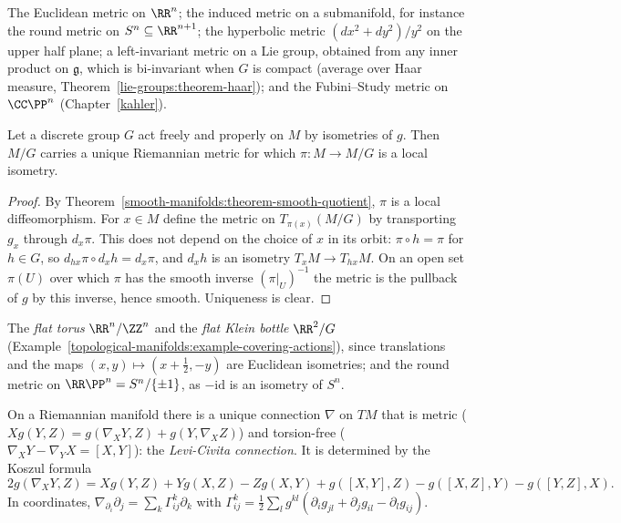 \begin{example}\label{riemannian-geometry:example-metrics}
The Euclidean metric on $\RR^n$; the induced metric on a submanifold, for instance the round metric on $S^n \subseteq \RR^{n+1}$; the hyperbolic metric $(dx^2 + dy^2)/y^2$ on the upper half plane; a
left-invariant metric on a Lie group, obtained from any inner product on $\mathfrak{g}$, which is bi-invariant when $G$ is compact (average over Haar measure,
Theorem~\ref{lie-groups:theorem-haar}); and the Fubini--Study metric on $\CC\PP^n$ (Chapter~\ref{kahler}).
\end{example}

\begin{proposition}\label{riemannian-geometry:proposition-quotient-metric}
Let a discrete group $G$ act freely and properly on $M$ by isometries of $g$. Then $M/G$ carries a unique Riemannian metric for which $\pi \colon M \to M/G$ is a local isometry.
\end{proposition}

\begin{proof}
By Theorem~\ref{smooth-manifolds:theorem-smooth-quotient}, $\pi$ is a local diffeomorphism. For $x \in M$ define the metric on $T_{\pi(x)}(M/G)$ by transporting $g_x$ through $d_x\pi$. This does not depend on the choice of $x$
in its orbit: $\pi \circ h = \pi$ for $h \in G$, so $d_{hx}\pi \circ d_xh = d_x\pi$, and $d_xh$ is an isometry $T_xM \to T_{hx}M$. On an open set $\pi(U)$ over which $\pi$ has the smooth inverse $(\pi|_U)^{-1}$ the metric is the pullback
of $g$ by this inverse, hence smooth. Uniqueness is clear.
\end{proof}

\begin{example}\label{riemannian-geometry:example-quotient-metrics}
The \emph{flat torus} $\RR^n/\ZZ^n$ and the \emph{flat Klein bottle} $\RR^2/G$ (Example~\ref{topological-manifolds:example-covering-actions}), since translations and the maps $(x, y) \mapsto (x + \frac12, -y)$ are Euclidean isometries; and
the round metric on $\RR\PP^n = S^n/\{\pm1\}$, as $-\mathrm{id}$ is an isometry of $S^n$.
\end{example}

\begin{theorem}\label{riemannian-geometry:theorem-levi-civita}
On a Riemannian manifold there is a unique connection $\nabla$ on $TM$ that is metric ($Xg(Y, Z) = g(\nabla_XY, Z) + g(Y, \nabla_XZ)$) and torsion-free ($\nabla_XY - \nabla_YX = [X, Y]$): the
\emph{Levi-Civita connection}. It is determined by the Koszul formula
\[
2g(\nabla_XY, Z) = Xg(Y, Z) + Yg(X, Z) - Zg(X, Y) + g([X, Y], Z) - g([X, Z], Y) - g([Y, Z], X).
\]
In coordinates, $\nabla_{\partial_i}\partial_j = \sum_k\Gamma^k_{ij}\partial_k$ with $\Gamma^k_{ij} = \frac12\sum_lg^{kl}(\partial_ig_{jl} + \partial_jg_{il} - \partial_lg_{ij})$.
\end{theorem}

